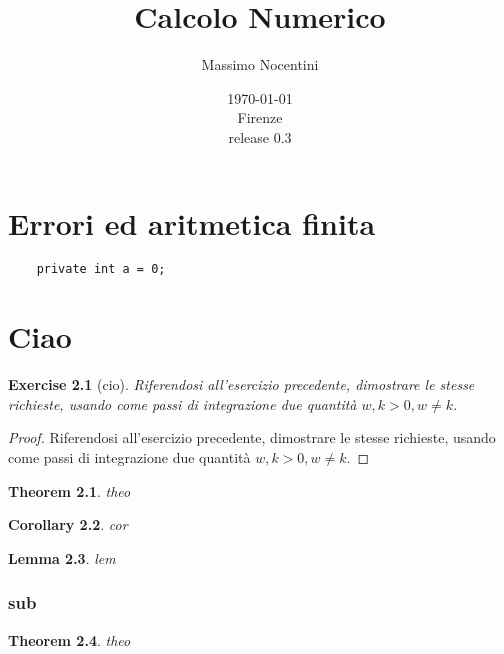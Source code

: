 \documentclass[12pt, a4paper]{report}
\title{Calcolo Numerico}
\author{Massimo Nocentini}
\date{\today \\Firenze\\ \small{release 0.3}}
\newtheorem{exercise}{Exercise}[section]
\newtheorem{thm}{Theorem}[section]
\newtheorem{cor}[thm]{Corollary}
\newtheorem{lem}[thm]{Lemma}
\begin{document}
\maketitle

\tableofcontents

\chapter{Errori ed aritmetica finita}





\lstset{language = java, numbers = left} 
\begin{lstlisting}
	private int a = 0; 
\end{lstlisting}

\chapter{Ciao}

\begin{exercise}[cio]
	Riferendosi all'esercizio precedente, dimostrare le stesse richieste, usando come passi di integrazione due quantit\`a $w, k > 0, w \not = k$. 
\end{exercise}

\begin{proof}
	Riferendosi all'esercizio precedente, dimostrare le stesse richieste, usando come passi di integrazione due quantit\`a $w, k > 0, w \not = k$. 
\end{proof}

\begin{thm}theo \end{thm}
\begin{cor} cor \end{cor}
\begin{lem}lem \end{lem}

\subsection{sub}
\begin{thm}theo \end{thm}
\end{document}
